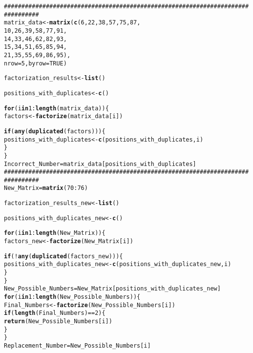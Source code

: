 \documentclass{article}\usepackage[]{graphicx}\usepackage[]{xcolor}
\makeatletter
\newcommand{\hlnum}[1]{\textcolor[rgb]{0.686,0.059,0.569}{#1}}%
\newcommand{\hlcom}[1]{\textcolor[rgb]{0.678,0.584,0.686}{\textit{#1}}}%
\newcommand{\hlopt}[1]{\textcolor[rgb]{0,0,0}{#1}}%
\newcommand{\hldef}[1]{\textcolor[rgb]{0.345,0.345,0.345}{#1}}%
\newcommand{\hlkwa}[1]{\textcolor[rgb]{0.161,0.373,0.58}{\textbf{#1}}}%
\newcommand{\hlkwb}[1]{\textcolor[rgb]{0.69,0.353,0.396}{#1}}%
\newcommand{\hlkwc}[1]{\textcolor[rgb]{0.333,0.667,0.333}{#1}}%
\newcommand{\hlkwd}[1]{\textcolor[rgb]{0.737,0.353,0.396}{\textbf{#1}}}%
\newenvironment{kframe}{%
 \def\at@end@of@kframe{}%
 \ifinner\ifhmode%
  \def\at@end@of@kframe{\end{minipage}}%
  \begin{minipage}{\columnwidth}%
 \fi\fi%
 \def\FrameCommand##1{\hskip\@totalleftmargin \hskip-\fboxsep
 \colorbox{shadecolor}{##1}\hskip-\fboxsep
     \hskip-\linewidth \hskip-\@totalleftmargin \hskip\columnwidth}%
 \MakeFramed {\advance\hsize-\width
   \@totalleftmargin\z@ \linewidth\hsize
   \@setminipage}}%
 {\par\unskip\endMakeFramed%
 \at@end@of@kframe}
\newenvironment{knitrout}{}{} %
\makeatother
\begin{document}
\begin{enumerate}
\begin{knitrout}
\begin{kframe}
\begin{alltt}
\hlcom{################################################################################}
\hldef{matrix_data} \hlkwb{<-} \hlkwd{matrix}\hldef{(}\hlkwd{c}\hldef{(}\hlnum{6}\hldef{,} \hlnum{22}\hldef{,} \hlnum{38}\hldef{,} \hlnum{57}\hldef{,} \hlnum{75}\hldef{,} \hlnum{87}\hldef{,}
                        \hlnum{10}\hldef{,} \hlnum{26}\hldef{,} \hlnum{39}\hldef{,} \hlnum{58}\hldef{,} \hlnum{77}\hldef{,} \hlnum{91}\hldef{,}
                        \hlnum{14}\hldef{,} \hlnum{33}\hldef{,} \hlnum{46}\hldef{,} \hlnum{62}\hldef{,} \hlnum{82}\hldef{,} \hlnum{93}\hldef{,}
                        \hlnum{15}\hldef{,} \hlnum{34}\hldef{,} \hlnum{51}\hldef{,} \hlnum{65}\hldef{,} \hlnum{85}\hldef{,} \hlnum{94}\hldef{,}
                        \hlnum{21}\hldef{,} \hlnum{35}\hldef{,} \hlnum{55}\hldef{,} \hlnum{69}\hldef{,} \hlnum{86}\hldef{,} \hlnum{95}\hldef{),}
                      \hlkwc{nrow} \hldef{=} \hlnum{5}\hldef{,} \hlkwc{byrow} \hldef{=} \hlnum{TRUE}\hldef{)}

\hldef{factorization_results} \hlkwb{<-} \hlkwd{list}\hldef{()}

\hldef{positions_with_duplicates} \hlkwb{<-} \hlkwd{c}\hldef{()}

\hlkwa{for} \hldef{(i} \hlkwa{in} \hlnum{1}\hlopt{:}\hlkwd{length}\hldef{(matrix_data)) \{}
  \hldef{factors} \hlkwb{<-} \hlkwd{factorize}\hldef{(matrix_data[i])}

  \hlkwa{if} \hldef{(}\hlkwd{any}\hldef{(}\hlkwd{duplicated}\hldef{(factors))) \{}
    \hldef{positions_with_duplicates} \hlkwb{<-} \hlkwd{c}\hldef{(positions_with_duplicates, i)}
  \hldef{\}}
\hldef{\}}
\hldef{Incorrect_Number} \hlkwb{=} \hldef{matrix_data[positions_with_duplicates]}
\hlcom{################################################################################}
\hldef{New_Matrix} \hlkwb{=} \hlkwd{matrix}\hldef{(}\hlnum{70}\hlopt{:}\hlnum{76}\hldef{)}

\hldef{factorization_results_new} \hlkwb{<-} \hlkwd{list}\hldef{()}

\hldef{positions_with_duplicates_new} \hlkwb{<-} \hlkwd{c}\hldef{()}

\hlkwa{for} \hldef{(i} \hlkwa{in} \hlnum{1}\hlopt{:}\hlkwd{length}\hldef{(New_Matrix)) \{}
  \hldef{factors_new} \hlkwb{<-} \hlkwd{factorize}\hldef{(New_Matrix[i])}

  \hlkwa{if} \hldef{(}\hlopt{!}\hlkwd{any}\hldef{(}\hlkwd{duplicated}\hldef{(factors_new))) \{}
    \hldef{positions_with_duplicates_new} \hlkwb{<-} \hlkwd{c}\hldef{(positions_with_duplicates_new, i)}
  \hldef{\}}
\hldef{\}}
\hldef{New_Possible_Numbers} \hlkwb{=} \hldef{New_Matrix[positions_with_duplicates_new]}
\hlkwa{for} \hldef{(i} \hlkwa{in} \hlnum{1}\hlopt{:}\hlkwd{length}\hldef{(New_Possible_Numbers)) \{}
  \hldef{Final_Numbers} \hlkwb{<-} \hlkwd{factorize}\hldef{(New_Possible_Numbers[i])}
  \hlkwa{if} \hldef{(}\hlkwd{length}\hldef{(Final_Numbers)} \hlopt{==} \hlnum{2}\hldef{) \{}
    \hlkwd{return}\hldef{(New_Possible_Numbers[i])}
  \hldef{\}}
\hldef{\}}
\hldef{Replacement_Number} \hlkwb{=} \hldef{New_Possible_Numbers[i]}


\end{alltt}
\end{kframe}
\end{knitrout}
\end{enumerate}
\end{document}
